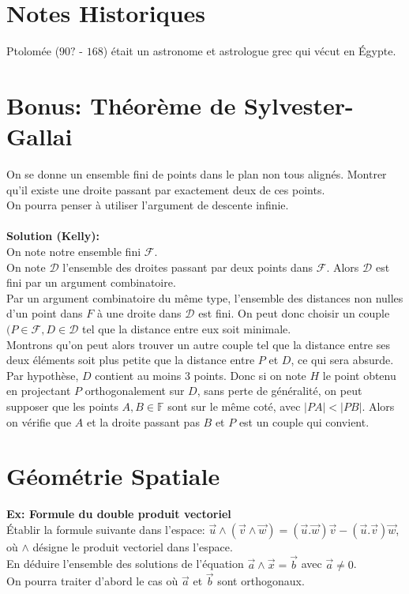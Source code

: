 \documentclass{article}
\begin{document}
\section{Notes Historiques}
Ptolom\'ee ($90?$ - $168$) \'etait un astronome et astrologue grec qui v\'ecut en \'Egypte.
\section{Bonus: Th\'eor\`eme de Sylvester-Gallai}
On se donne un ensemble fini de points dans le plan non tous align\'es. Montrer qu'il existe une droite passant par exactement deux de ces points.\\
On pourra penser \`a utiliser l'argument de descente infinie.\\
\\
\textbf{Solution (Kelly):}\\
On note notre ensemble fini $\mathcal{F}$.\\
On note $\mathcal{D}$ l'ensemble des droites passant par deux points dans $\mathcal{F}$. Alors $\mathcal{D}$ est fini par un argument combinatoire.\\
Par un argument combinatoire du m\^eme type, l'ensemble des distances non nulles d'un point dans $F$ \`a une droite dans $\mathcal{D}$ est fini. On peut donc choisir un couple $(P\in\mathcal{F},D\in\mathcal{D}$ tel que la distance entre eux soit minimale.\\
Montrons qu'on peut alors trouver un autre couple tel que la distance entre ses deux \'el\'ements soit plus petite que la distance entre $P$ et $D$, ce qui sera absurde.\\
Par hypoth\`ese, $D$ contient au moins $3$ points. Donc si on note $H$ le point obtenu en projectant $P$ orthogonalement sur $D$, sans perte de g\'en\'eralit\'e, on peut supposer que les points $A,B\in\mathbb{F}$ sont sur le m\^eme cot\'e, avec $|PA|<|PB|$. Alors on v\'erifie que $A$ et la droite passant pas $B$ et $P$ est un couple qui convient.

\section{G\'eom\'etrie Spatiale}
\textbf{Ex: Formule du double produit vectoriel}\\
\'Etablir la formule suivante dans l'espace: $\overrightarrow{u}\wedge(\overrightarrow{v}\wedge\overrightarrow{w})=(\overrightarrow{u}.\overrightarrow{w})\overrightarrow{v}-(\overrightarrow{u}.\overrightarrow{v})\overrightarrow{w}$, o\`u $\wedge$ d\'esigne le produit vectoriel dans l'espace.\\
En d\'eduire l'ensemble des solutions de l'\'equation $\overrightarrow{a}\wedge\overrightarrow{x}=\overrightarrow{b}$ avec $\overrightarrow{a}\neq 0$.\\
On pourra traiter d'abord le cas o\`u $\overrightarrow{a}$ et $\overrightarrow{b}$ sont orthogonaux.
\end{document}
